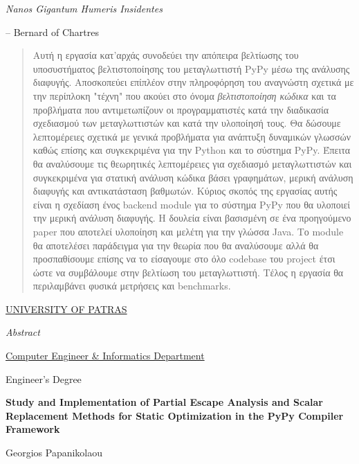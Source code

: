 \documentclass[12pt, english, singlespacing, parskip, headsepline]{MastersDoctoralThesis}
\begin{document}
\newpage\null\thispagestyle{empty}\newpage
\vspace*{0.2\textheight}

\noindent\textit{Nanos Gigantum Humeris Insidentes}\bigbreak

\hfill – Bernard of Chartres


\begin{abstract}

Αυτή η εργασία κατ'αρχάς συνοδεύει την απόπειρα βελτίωσης του υποσυστήματος
βελτιστοποίησης του μεταγλωττιστή PyPy μέσω της ανάλυσης διαφυγής. Αποσκοπεύει
επίπλέον στην πληροφόρηση του αναγνώστη σχετικά με την περίπλοκη "τέχνη" που
ακούει στο όνομα \textit{βελτιστοποίηση κώδικα} και τα προβλήματα που
αντιμετωπίζουν οι προγραμματιστές κατά την διαδικασία σχεδιασμού των
μεταγλωττιστών και κατά την υλοποίησή τους. Θα δώσουμε λεπτομέρειες σχετικά με
γενικά προβλήματα για ανάπτυξη δυναμικών γλωσσών καθώς επίσης και συγκεκριμένα
για την Python και το σύστημα PyPy. Έπειτα θα αναλύσουμε τις θεωρητικές
λεπτομέρειες για σχεδιασμό μεταγλωττιστών και συγκεκριμένα για στατική ανάλυση
κώδικα βάσει γραφημάτων, μερική ανάλυση διαφυγής και αντικατάσταση βαθμωτών.
Κύριος σκοπός της εργασίας αυτής είναι η σχεδίαση ένος backend module για το
σύστημα PyPy που θα υλοποιεί την μερική ανάλυση διαφυγής. Η δουλεία είναι
βασισμένη σε ένα προηγούμενο paper που αποτελεί υλοποίηση και μελέτη για την
γλώσσα Java. Το module θα αποτελέσει παράδειγμα για την θεωρία που θα αναλύσουμε
αλλά θα προσπαθίσουμε επίσης να το είσαγουμε στο όλο codebase του project έτσι
ώστε να συμβάλουμε στην βελτίωση του μεταγλωττιστή. Τέλος η εργασία θα
περιλαμβάνει φυσικά μετρήσεις και benchmarks.


\end{abstract}

\newpage\null\thispagestyle{empty}\newpage
\checktoopen
\tttypeout{\abstractname}
\null\vfil
\thispagestyle{plain}
\begin{center}
{\normalsize \MakeUppercase{\href{http://www.upatras.gr/en}{University of Patras}} \par}
\bigskip
{\huge\textit{Abstract} \par}
\bigskip
{\normalsize \href{https://www.ceid.upatras.gr/en/}{Computer Engineer \& Informatics Department} \par}
\bigskip
{\normalsize Engineer's Degree\par}
\bigskip
{\normalsize\bfseries Study and Implementation of Partial Escape Analysis and Scalar
Replacement Methods for Static Optimization in the PyPy Compiler Framework \par}
\medskip
{\normalsize Georgios Papanikolaou \par}
\bigskip
\end{center}
\end{document}
